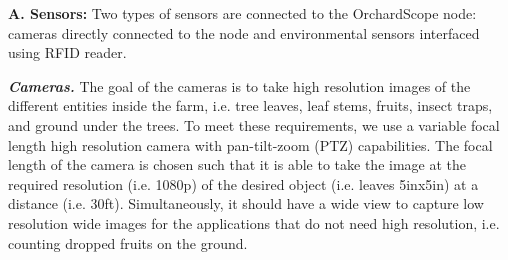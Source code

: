 
\noindent
\textbf{A. Sensors:}
\label{sec: sensors}
Two types of sensors are connected to the OrchardScope node: cameras directly connected to the node and environmental sensors interfaced using RFID reader.


\noindent
\textit{\textbf{Cameras.}}
The goal of the cameras is to take high resolution images of the different entities inside the farm, i.e. tree leaves, leaf stems,  fruits, insect traps, and ground under the trees. To meet these requirements, we use a variable focal length high resolution camera with pan-tilt-zoom (PTZ) capabilities. The focal length of the camera is chosen such that it is able to take the image at the required resolution (i.e. 1080p) of the desired object (i.e. leaves 5inx5in) at a distance (i.e. 30ft). Simultaneously, it should have a wide view to capture low resolution wide images for the applications that do not need high resolution, i.e. counting dropped fruits on the ground. 




